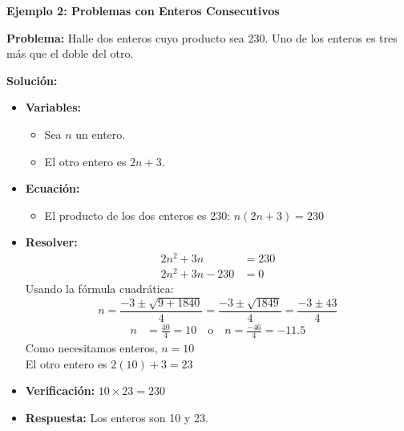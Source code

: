 \begin{example}
\textbf{Ejemplo 2: Problemas con Enteros Consecutivos}

\textbf{Problema:} Halle dos enteros cuyo producto sea 230. Uno de los enteros es tres más que el doble del otro.

\textbf{Solución:}
\begin{itemize}
    \item \textbf{Variables:}
    \begin{itemize}
        \item Sea $n$ un entero.
        \item El otro entero es $2n + 3$.
    \end{itemize}
    \item \textbf{Ecuación:}
    \begin{itemize}
        \item El producto de los dos enteros es 230: $n(2n + 3) = 230$
    \end{itemize}
    \item \textbf{Resolver:}
    \begin{align*}
    2n^2 + 3n &= 230 \\
    2n^2 + 3n - 230 &= 0
    \end{align*}
    Usando la fórmula cuadrática:
    $$n = \frac{-3 \pm \sqrt{9 + 1840}}{4} = \frac{-3 \pm \sqrt{1849}}{4} = \frac{-3 \pm 43}{4}$$
    \begin{align*}
    n &= \frac{40}{4} = 10 \quad \text{o} \quad n = \frac{-46}{4} = -11.5
    \end{align*}
    Como necesitamos enteros, $n = 10$ \\
    El otro entero es $2(10) + 3 = 23$
    \item \textbf{Verificación:} $10 \times 23 = 230$ \checkmark
    \item \textbf{Respuesta:} Los enteros son 10 y 23.
\end{itemize}
\end{example}

